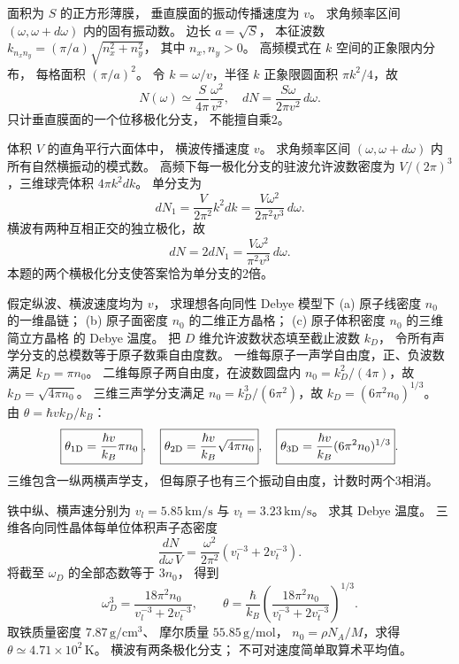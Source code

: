 面积为 $S$ 的正方形薄膜，
垂直膜面的振动传播速度为 $v$。
求角频率区间 $(\omega,\omega+d\omega)$
内的固有振动数。
\exsolution
边长 $a=\sqrt S$，
本征波数
$k_{n_xn_y}=(\pi/a)\sqrt{n_x^2+n_y^2}$，
其中 $n_x,n_y>0$。
高频模式在 $k$ 空间的正象限内分布，
每格面积 $(\pi/a)^2$。
令 $k=\omega/v$，半径 $k$ 正象限圆面积
$\pi k^2/4$，故
\[
 N(\omega)\simeq
 \frac{S}{4\pi}\frac{\omega^2}{v^2},\quad
 \boxed{dN=\frac{S\omega}{2\pi v^2}\,d\omega}.
\]
\excheck 只计垂直膜面的一个位移极化分支，
不能擅自乘2。

体积 $V$ 的直角平行六面体中，
横波传播速度 $v$。
求角频率区间 $(\omega,\omega+d\omega)$
内所有自然横振动的模式数。
\exsolution
高频下每一极化分支的驻波允许波数密度为
$V/(2\pi)^3$，三维球壳体积 $4\pi k^2dk$。
单分支为
\[
 dN_1=\frac{V}{2\pi^2}k^2dk
 =\frac{V\omega^2}{2\pi^2v^3}\,d\omega.
\]
横波有两种互相正交的独立极化，故
\[
 \boxed{dN=2dN_1=
 \frac{V\omega^2}{\pi^2v^3}\,d\omega}.
\]
\excheck 本题的两个横极化分支使答案恰为单分支的2倍。

假定纵波、横波速度均为 $v$，
求理想各向同性 Debye 模型下
(a) 原子线密度 $n_0$ 的一维晶链；
(b) 原子面密度 $n_0$ 的二维正方晶格；
(c) 原子体积密度 $n_0$ 的三维简立方晶格
的 Debye 温度。
\exsolution
把 $D$ 维允许波数状态填至截止波数 $k_D$，
令所有声学分支的总模数等于原子数乘自由度数。
一维每原子一声学自由度，正、负波数满足
$k_D=\pi n_0$。
二维每原子两自由度，在波数圆盘内
$n_0=k_D^2/(4\pi)$，故 $k_D=\sqrt{4\pi n_0}$。
三维三声学分支满足
$n_0=k_D^3/(6\pi^2)$，故
$k_D=(6\pi^2n_0)^{1/3}$。
由 $\theta=\hbar vk_D/k_B$：
\[
 \boxed{\theta_{\rm1D}=\frac{\hbar v}{k_B}\pi n_0},\quad
 \boxed{\theta_{\rm2D}=\frac{\hbar v}{k_B}\sqrt{4\pi n_0}},\quad
 \boxed{\theta_{\rm3D}=\frac{\hbar v}{k_B}(6\pi^2n_0)^{1/3}}.
\]
\excheck 三维包含一纵两横声学支，
但每原子也有三个振动自由度，计数时两个3相消。

铁中纵、横声速分别为
$v_l=5.85\,\mathrm{km/s}$ 与
$v_t=3.23\,\mathrm{km/s}$。
求其 Debye 温度。
\exsolution
三维各向同性晶体每单位体积声子态密度
\[
 \frac{dN}{d\omega\,V}=
 \frac{\omega^2}{2\pi^2}
 \left(v_l^{-3}+2v_t^{-3}\right).
\]
将截至 $\omega_D$ 的全部态数等于 $3n_0$，
得到
\[
 \omega_D^3=\frac{18\pi^2n_0}
 {v_l^{-3}+2v_t^{-3}},\qquad
 \boxed{\theta=\frac{\hbar}{k_B}
 \left(\frac{18\pi^2n_0}
 {v_l^{-3}+2v_t^{-3}}\right)^{1/3}}.
\]
取铁质量密度 $7.87\,\mathrm{g/cm^3}$、
摩尔质量 $55.85\,\mathrm{g/mol}$，
$n_0=\rho N_A/M$，求得
$\boxed{\theta\simeq4.71\times10^2\,\mathrm K}$。
\excheck 横波有两条极化分支；
不可对速度简单取算术平均值。

